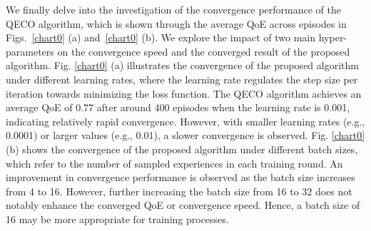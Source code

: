 \documentclass[12pt,draftclsnofoot,onecolumn]{IEEEtran}
\begin{document}
We finally delve into the investigation of the convergence performance of the QECO algorithm, which is shown through the average QoE across episodes in Figs.~\ref{chart0} (a) and~\ref{chart0} (b). We explore the impact of two main hyper-parameters on the convergence speed and the converged result of the proposed algorithm. Fig. \ref{chart0} (a) illustrates the convergence of the proposed algorithm under different learning rates, where the learning rate regulates the step size per iteration towards minimizing the loss function. The QECO algorithm achieves an average QoE of 0.77 after around 400 episodes when the learning rate is 0.001, indicating relatively rapid convergence. However, with smaller learning rates (e.g., 0.0001) or larger values (e.g., 0.01),  a slower convergence is observed. Fig. \ref{chart0} (b) shows the convergence of the proposed algorithm under different batch sizes, which refer to the number of sampled experiences in each training round. An improvement in convergence performance is observed as the batch size increases from 4 to 16. However, further increasing the batch size from 16 to 32 does not notably enhance the converged QoE or convergence speed. Hence, a batch size of 16 may be more appropriate for training processes.
\end{document}
